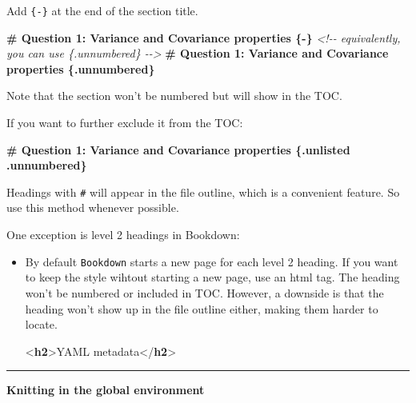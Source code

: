 \documentclass[
  a4paper,
  twoside,
  openright]{book}
\newenvironment{Shaded}{\begin{snugshade}}{\end{snugshade}}
\newcommand{\CommentTok}[1]{\textcolor[rgb]{0.56,0.35,0.01}{\textit{#1}}}
\newcommand{\DataTypeTok}[1]{\textcolor[rgb]{0.13,0.29,0.53}{#1}}
\newcommand{\FunctionTok}[1]{\textcolor[rgb]{0.13,0.29,0.53}{\textbf{#1}}}
\newcommand{\KeywordTok}[1]{\textcolor[rgb]{0.13,0.29,0.53}{\textbf{#1}}}
\newcommand{\NormalTok}[1]{#1}
\theoremstyle{definition}
\theoremstyle{definition}
\theoremstyle{definition}
\theoremstyle{definition}
\theoremstyle{remark}
\begin{document}
Add \texttt{\{-\}} at the end of the section title.

\begin{Shaded}
\begin{Highlighting}[]
\FunctionTok{\# Question 1: Variance and Covariance properties \{{-}\}}
\CommentTok{\textless{}!{-}{-} equivalently, you can use \{.unnumbered\} {-}{-}\textgreater{}} 
\FunctionTok{\# Question 1: Variance and Covariance properties \{.unnumbered\}}
\end{Highlighting}
\end{Shaded}

Note that the section won't be numbered but will show in the TOC.

If you want to further exclude it from the TOC:

\begin{Shaded}
\begin{Highlighting}[]
\FunctionTok{\# Question 1: Variance and Covariance properties \{.unlisted .unnumbered\}}
\end{Highlighting}
\end{Shaded}

Headings with \texttt{\#} will appear in the file outline, which is a convenient feature. So use this method whenever possible.

One exception is level 2 headings in Bookdown:

\begin{itemize}
\item
  By default \texttt{Bookdown} starts a new page for each level 2 heading. If you want to keep the style wihtout starting a new page, use an html tag. The heading won't be numbered or included in TOC. However, a downside is that the heading won't show up in the file outline either, making them harder to locate.

\begin{Shaded}
\begin{Highlighting}[]
\DataTypeTok{\textless{}}\KeywordTok{h2}\DataTypeTok{\textgreater{}}\NormalTok{YAML metadata}\DataTypeTok{\textless{}/}\KeywordTok{h2}\DataTypeTok{\textgreater{}}
\end{Highlighting}
\end{Shaded}
\end{itemize}

\begin{center}\rule{0.5\linewidth}{0.5pt}\end{center}

\textbf{Knitting in the global environment}
\end{document}
